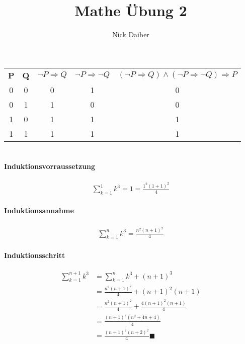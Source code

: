 \documentclass{article}
\title{Mathe Übung 2}
\author{Nick Daiber}
\begin{document}
    \maketitle
    \section{}
        \begin{tabular}{c|c|c|c|c}
            \textbf{P}& \textbf{Q}&
            \textbf{$\neg P\Rightarrow Q$}& \textbf{$\neg P\Rightarrow \neg Q$}&
            \textbf{$(\neg P\Rightarrow Q)\land(\neg P\Rightarrow \neg Q)\Rightarrow P$}\\
            0&0&0&1&0\\
            0&1&1&0&0\\
            1&0&1&1&1\\
            1&1&1&1&1\\
        \end{tabular}
    \section{}
        \subsection{}
            \paragraph{Induktionsvorraussetzung}
                \begin{align*}
                    \sum_{k=1}^1 k^3 = 1 = \frac{1^2(1+1)^2}{4}
                \end{align*}
            \paragraph{Induktionsannahme}
                \begin{align*}
                    \sum_{k=1}^n k^3 = \frac{n^2(n+1)^2}{4}
                \end{align*}
            \paragraph{Induktionsschritt}
                \begin{align*}
                    \sum_{k=1}^{n+1} k^3 
                    &= \sum_{k=1}^{n} k^3 + (n+1)^3\\
                    &=\frac{n^2(n+1)^2}{4} + (n+1)^2(n+1)\\
                    &=\frac{n^2(n+1)^2}{4} + \frac{4(n+1)^2(n+1)}{4}\\
                    &=\frac{(n+1)^2(n^2+4n+4)}{4}\\
                    &=\frac{(n+1)^2(n+2)^2}{4} \blacksquare
                \end{align*}
\end{document}
